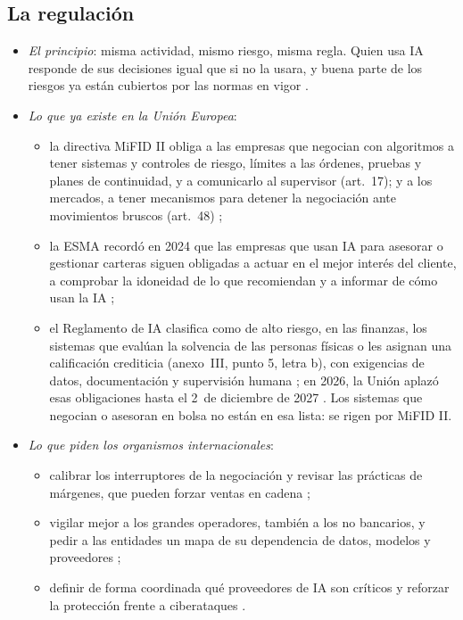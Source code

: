 \documentclass[11pt]{article}
\begin{document}
\subsection{La regulación}

\begin{itemize}
\item \emph{El principio}: misma actividad, mismo riesgo, misma regla. Quien usa IA responde de sus decisiones igual que si no la usara, y buena parte de los riesgos ya están cubiertos por las normas en vigor \parencite{FMI2024GFSR3,IOSCO2025AI}.
\item \emph{Lo que ya existe en la Unión Europea}:
  \begin{itemize}
  \item la directiva MiFID II obliga a las empresas que negocian con algoritmos a tener sistemas y controles de riesgo, límites a las órdenes, pruebas y planes de continuidad, y a comunicarlo al supervisor (art.~17); y a los mercados, a tener mecanismos para detener la negociación ante movimientos bruscos (art.~48) \parencite{UE2014MiFID2};
  \item la ESMA recordó en 2024 que las empresas que usan IA para asesorar o gestionar carteras siguen obligadas a actuar en el mejor interés del cliente, a comprobar la idoneidad de lo que recomiendan y a informar de cómo usan la IA \parencite{ESMA2024AI};
  \item el Reglamento de IA clasifica como de alto riesgo, en las finanzas, los sistemas que evalúan la solvencia de las personas físicas o les asignan una calificación crediticia (anexo~III, punto 5, letra b), con exigencias de datos, documentación y supervisión humana \parencite{UE2024ReglamentoIA}; en 2026, la Unión aplazó esas obligaciones hasta el 2~de diciembre de 2027 \parencite{Consejo2026OmnibusIA}. Los sistemas que negocian o asesoran en bolsa no están en esa lista: se rigen por MiFID II.
  \end{itemize}
\item \emph{Lo que piden los organismos internacionales}:
  \begin{itemize}
  \item calibrar los interruptores de la negociación y revisar las prácticas de márgenes, que pueden forzar ventas en cadena \parencite{FMI2024GFSR3};
  \item vigilar mejor a los grandes operadores, también a los no bancarios, y pedir a las entidades un mapa de su dependencia de datos, modelos y proveedores \parencite{FMI2024GFSR3,FSB2024AI};
  \item definir de forma coordinada qué proveedores de IA son críticos y reforzar la protección frente a ciberataques \parencite{FMI2024GFSR3}.

\end{itemize}
\end{itemize}
\end{document}
